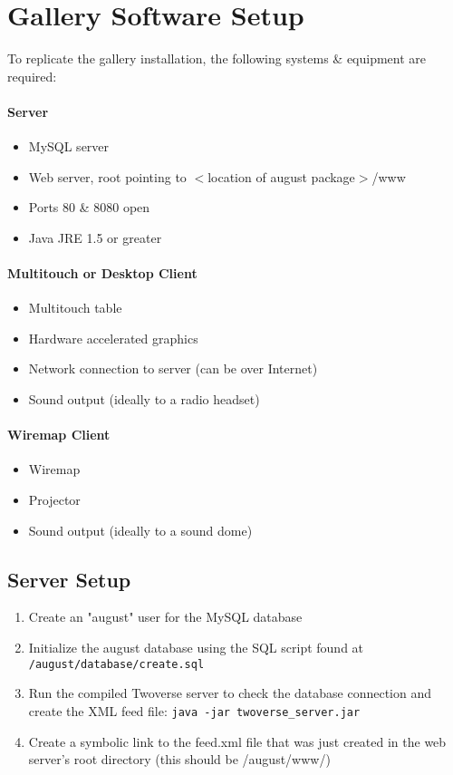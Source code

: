 \section{Gallery Software Setup}
To replicate the gallery installation, the following systems \& equipment are required:

\paragraph{Server}
\begin{itemize}
\item MySQL server
\item Web server, root pointing to $<$location of august package$>$/www
\item Ports 80 \& 8080 open
\item Java JRE 1.5 or greater
\end{itemize}

\paragraph{Multitouch or Desktop Client}
\begin{itemize}
\item Multitouch table
\item Hardware accelerated graphics
\item Network connection to server (can be over Internet)
\item Sound output (ideally to a radio headset)
\end{itemize}

\paragraph{Wiremap Client}
\begin{itemize}
\item Wiremap
\item Projector
\item Sound output (ideally to a sound dome)
\end{itemize}

\subsection{Server Setup}
\begin{enumerate}
\item Create an "august" user for the MySQL database
\item Initialize the august database using the SQL script found at \texttt{/august/database/create.sql}
\item Run the compiled Twoverse server to check the database connection and create the XML feed file: \texttt{java -jar twoverse\_server.jar}
\item Create a symbolic link to the feed.xml file that was just created in the web server's root directory (this should be /august/www/)
\end{enumerate}

